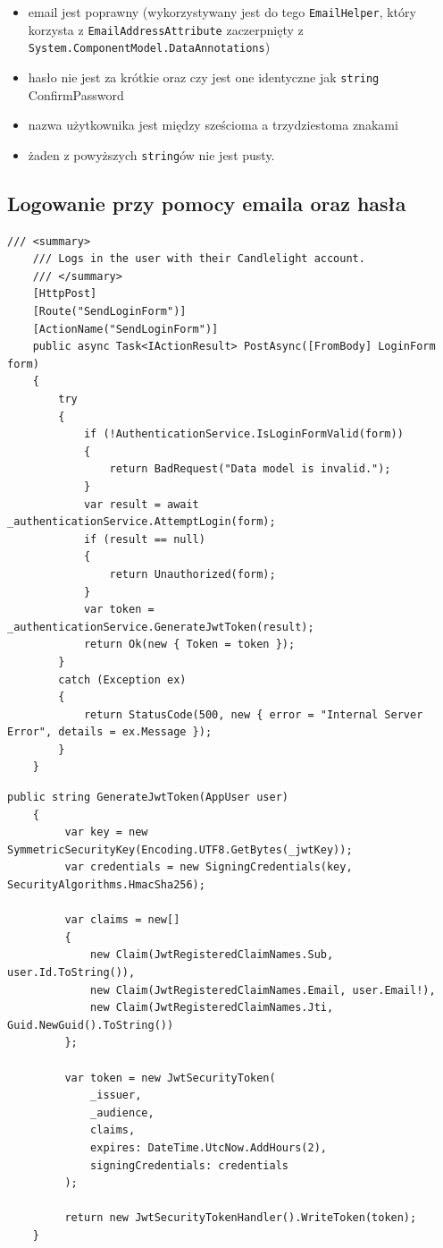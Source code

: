 \documentclass[a4paper,twoside,12pt]{book}
\begin{document}
\begin{itemize}
    \item email jest poprawny (wykorzystywany jest do tego \texttt{EmailHelper}, który korzysta z \texttt{EmailAddressAttribute} zaczerpnięty z \texttt{System.ComponentModel.DataAnnotations})
    \item hasło nie jest za krótkie oraz czy jest one identyczne jak \texttt{string} ConfirmPassword
    \item nazwa użytkownika jest między sześcioma a trzydziestoma znakami
    \item żaden z powyższych \texttt{string}ów nie jest pusty.
\end{itemize}

\subsection{Logowanie przy pomocy emaila oraz hasła}

\begin{lstlisting}[caption=Kontroler UserAccessController: endpoint SendLoginForm, label=lst:sendloginform]
    /// <summary>
    /// Logs in the user with their Candlelight account.
    /// </summary>
    [HttpPost]
    [Route("SendLoginForm")]
    [ActionName("SendLoginForm")]
    public async Task<IActionResult> PostAsync([FromBody] LoginForm form)
    {
        try
        {
            if (!AuthenticationService.IsLoginFormValid(form))
            {
                return BadRequest("Data model is invalid.");
            }
            var result = await _authenticationService.AttemptLogin(form);
            if (result == null)
            {
                return Unauthorized(form);
            }
            var token = _authenticationService.GenerateJwtToken(result);
            return Ok(new { Token = token });
        }
        catch (Exception ex)
        {
            return StatusCode(500, new { error = "Internal Server Error", details = ex.Message });
        }
    }
\end{lstlisting}

\begin{lstlisting}[caption=Serwis AuthenticationService: metoda GenerateJwtToken, label=lst:generatejwttoken]
    public string GenerateJwtToken(AppUser user)
    {
         var key = new SymmetricSecurityKey(Encoding.UTF8.GetBytes(_jwtKey));
         var credentials = new SigningCredentials(key, SecurityAlgorithms.HmacSha256);
        
         var claims = new[]
         {
             new Claim(JwtRegisteredClaimNames.Sub, user.Id.ToString()),
             new Claim(JwtRegisteredClaimNames.Email, user.Email!),
             new Claim(JwtRegisteredClaimNames.Jti, Guid.NewGuid().ToString())
         };
        
         var token = new JwtSecurityToken(
             _issuer,
             _audience,
             claims,
             expires: DateTime.UtcNow.AddHours(2),
             signingCredentials: credentials
         );
        
         return new JwtSecurityTokenHandler().WriteToken(token);
    }
\end{lstlisting}
\end{document}
